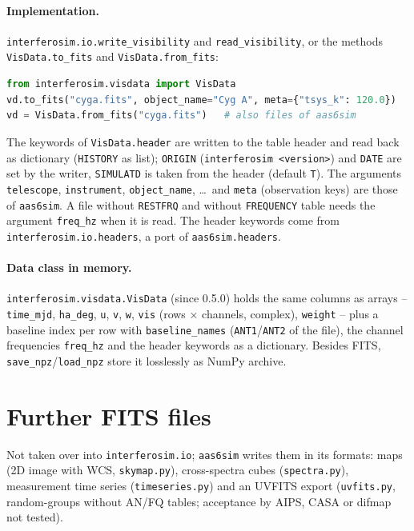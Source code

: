 \paragraph*{Implementation.} \texttt{interferosim.io.write\_visibility}
and \texttt{read\_visibility}, or the methods \texttt{VisData.to\_fits}
and \texttt{VisData.from\_fits}:
\begin{lstlisting}[language=Python, basicstyle=\ttfamily\footnotesize, frame=single]
from interferosim.visdata import VisData
vd.to_fits("cyga.fits", object_name="Cyg A", meta={"tsys_k": 120.0})
vd = VisData.from_fits("cyga.fits")   # also files of aas6sim
\end{lstlisting}
The keywords of \texttt{VisData.header} are written to the table header
and read back as dictionary (\texttt{HISTORY} as list); \texttt{ORIGIN}
(\texttt{interferosim <version>}) and \texttt{DATE} are set by the
writer, \texttt{SIMULATD} is taken from the header (default \texttt{T}).
The arguments \texttt{telescope}, \texttt{instrument},
\texttt{object\_name}, \dots\ and \texttt{meta} (observation keys) are
those of \texttt{aas6sim}. A file without \texttt{RESTFRQ} and without
\texttt{FREQUENCY} table needs the argument \texttt{freq\_hz} when it is read.
The header keywords come from \texttt{interferosim.io.headers}, a port of
\texttt{aas6sim.headers}.

\paragraph*{Data class in memory.} \texttt{interferosim.visdata.VisData}
(since 0.5.0) holds the same columns as arrays -- \texttt{time\_mjd},
\texttt{ha\_deg}, \texttt{u}, \texttt{v}, \texttt{w}, \texttt{vis} (rows
$\times$ channels, complex), \texttt{weight} -- plus a baseline index per row
with \texttt{baseline\_names} (\texttt{ANT1}/\texttt{ANT2} of the file), the
channel frequencies \texttt{freq\_hz} and the header keywords as a
dictionary. %
Besides FITS, \texttt{save\_npz}/\texttt{load\_npz} store it losslessly
as NumPy archive.

\section{Further FITS files}

Not taken over into \texttt{interferosim.io}; \texttt{aas6sim} writes them
in its formats: maps (2D image with WCS,
\texttt{skymap.py}), cross-spectra cubes (\texttt{spectra.py}),
measurement time series (\texttt{timeseries.py}) and an UVFITS export
(\texttt{uvfits.py}, random-groups without AN/FQ tables; acceptance by
AIPS, CASA or difmap not tested).

